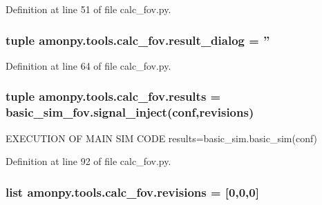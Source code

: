 Definition at line 51 of file calc\-\_\-fov.\-py.

\hypertarget{namespaceamonpy_1_1tools_1_1calc__fov_af2bbe22561fc8fb6837ea58b5d8a0cd4}{
\subsubsection[{result\-\_\-dialog}]{\setlength{\rightskip}{0pt plus 5cm}tuple amonpy.\-tools.\-calc\-\_\-fov.\-result\-\_\-dialog = ''}}\label{namespaceamonpy_1_1tools_1_1calc__fov_af2bbe22561fc8fb6837ea58b5d8a0cd4}


Definition at line 64 of file calc\-\_\-fov.\-py.

\hypertarget{namespaceamonpy_1_1tools_1_1calc__fov_a4bc31903fbe30c866faaa99229b67d5b}{
\subsubsection[{results}]{\setlength{\rightskip}{0pt plus 5cm}tuple amonpy.\-tools.\-calc\-\_\-fov.\-results = basic\-\_\-sim\-\_\-fov.\-signal\-\_\-inject({\bf conf},{\bf revisions})}}\label{namespaceamonpy_1_1tools_1_1calc__fov_a4bc31903fbe30c866faaa99229b67d5b}


E\-X\-E\-C\-U\-T\-I\-O\-N O\-F M\-A\-I\-N S\-I\-M C\-O\-D\-E results=basic\-\_\-sim.\-basic\-\_\-sim(conf) 



Definition at line 92 of file calc\-\_\-fov.\-py.

\hypertarget{namespaceamonpy_1_1tools_1_1calc__fov_ad4753f6c1a088c4b50d3ba93205b751a}{
\subsubsection[{revisions}]{\setlength{\rightskip}{0pt plus 5cm}list amonpy.\-tools.\-calc\-\_\-fov.\-revisions = \mbox{[}0,0,0\mbox{]}}}\label{namespaceamonpy_1_1tools_1_1calc__fov_ad4753f6c1a088c4b50d3ba93205b751a}


